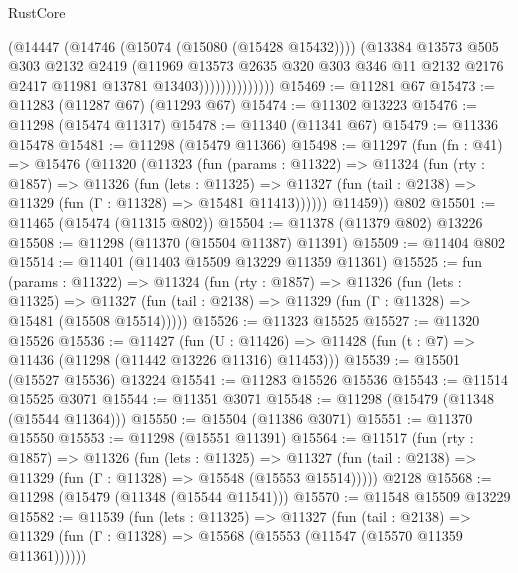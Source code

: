 \begin{lexlean}{RustCore}
\begin{coremodule}
                          (@14447
                            (@14746 (@15074 (@15080 (@15428 @15432))))
                            (@13384
                              @13573
                              @505
                              @303
                              @2132
                              @2419
                              (@11969
                                @13573
                                @2635
                                @320
                                @303
                                @346
                                @11
                                @2132
                                @2176
                                @2417
                                @11981
                                @13781
                                @13403))))))))))))))
@15469 := @11281 @67
@15473 := @11283 (@11287 @67) (@11293 @67)
@15474 := @11302 @13223
@15476 := @11298 (@15474 @11317)
@15478 := @11340 (@11341 @67)
@15479 := @11336 @15478
@15481 := @11298 (@15479 @11366)
@15498 := @11297
    (fun (fn : @41) =>
    @15476
      (@11320
        (@11323
          (fun (params : @11322) =>
          @11324
            (fun (rty : @1857) =>
            @11326
              (fun (lets : @11325) =>
              @11327 (fun (tail : @2138) => @11329 (fun (Γ : @11328) => @15481 @11413))))))
        @11459))
    @802
@15501 := @11465 (@15474 (@11315 @802))
@15504 := @11378 (@11379 @802) @13226
@15508 := @11298 (@11370 (@15504 @11387) @11391)
@15509 := @11404 @802
@15514 := @11401 (@11403 @15509 @13229 @11359 @11361)
@15525 := fun (params : @11322) =>
  @11324
    (fun (rty : @1857) =>
    @11326
      (fun (lets : @11325) =>
      @11327 (fun (tail : @2138) => @11329 (fun (Γ : @11328) => @15481 (@15508 @15514)))))
@15526 := @11323 @15525
@15527 := @11320 @15526
@15536 := @11427
    (fun (U : @11426) => @11428 (fun (t : @7) => @11436 (@11298 (@11442 @13226 @11316) @11453)))
@15539 := @15501 (@15527 @15536) @13224
@15541 := @11283 @15526 @15536
@15543 := @11514 @15525 @3071
@15544 := @11351 @3071
@15548 := @11298 (@15479 (@11348 (@15544 @11364)))
@15550 := @15504 (@11386 @3071)
@15551 := @11370 @15550
@15553 := @11298 (@15551 @11391)
@15564 := @11517
    (fun (rty : @1857) =>
    @11326
      (fun (lets : @11325) =>
      @11327 (fun (tail : @2138) => @11329 (fun (Γ : @11328) => @15548 (@15553 @15514)))))
    @2128
@15568 := @11298 (@15479 (@11348 (@15544 @11541)))
@15570 := @11548 @15509 @13229
@15582 := @11539
    (fun (lets : @11325) =>
    @11327
      (fun (tail : @2138) =>
      @11329 (fun (Γ : @11328) => @15568 (@15553 (@11547 (@15570 @11359 @11361))))))

\end{coremodule}
\end{lexlean}
